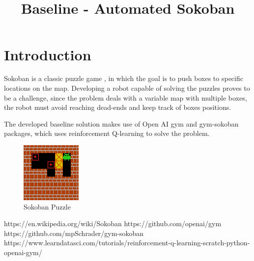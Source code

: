 \documentclass[conference]{IEEEtran}
\begin{document}
    
    \title{Baseline - Automated Sokoban}
    
    \author{
    \and
    \and
    \and
    }
    
    \maketitle
    
    \section{Introduction}
    
    Sokoban is a classic puzzle game \cite{b1}, in which the goal is to push boxes to specific locations on the map. Developing a robot capable of solving the puzzles proves to be a challenge, since the problem deals with a variable map with multiple boxes, the robot must avoid reaching dead-ends and keep track of boxes positions.
    
    The developed baseline solution makes use of Open AI gym \cite{b2} and gym-sokoban \cite{b3} packages, which uses reinforcement Q-learning to solve the problem. \cite{b4}
    \begin{figure}[!htb]
    \begin{center}
    \includegraphics{pictures/Sokoban-small-v0.png}    
    \end{center}
    \caption{Sokoban Puzzle}
    \end{figure}
    
    \begin{thebibliography}{00}
     https://en.wikipedia.org/wiki/Sokoban 
     https://github.com/openai/gym 
     https://github.com/mpSchrader/gym-sokoban
     https://www.learndatasci.com/tutorials/reinforcement-q-learning-scratch-python-openai-gym/
    
    \end{thebibliography}
    
    
\end{document}
